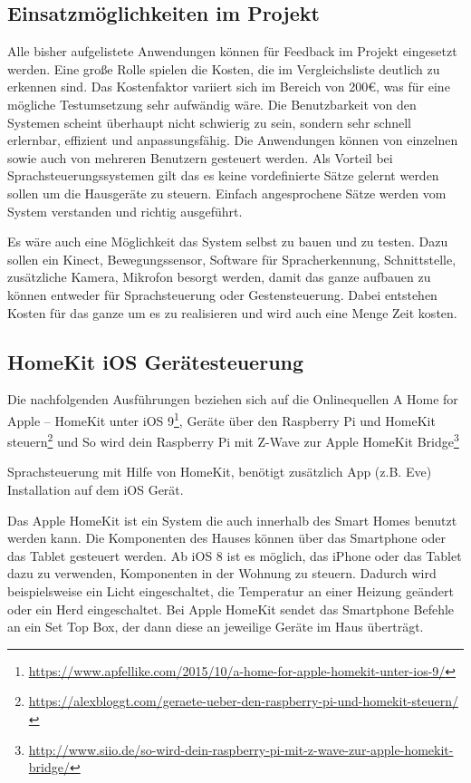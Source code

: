 \subsection{Einsatzmöglichkeiten im Projekt}
Alle bisher aufgelistete Anwendungen können für Feedback im Projekt eingesetzt werden. Eine große Rolle spielen die Kosten, die im Vergleichsliste deutlich zu erkennen sind. Das Kostenfaktor variiert sich im Bereich von 200€, was für eine mögliche Testumsetzung sehr aufwändig wäre. Die Benutzbarkeit von den Systemen scheint überhaupt nicht schwierig zu sein, sondern sehr schnell erlernbar, effizient und anpassungsfähig. Die Anwendungen können von einzelnen sowie auch von mehreren Benutzern gesteuert werden. Als Vorteil bei Sprachsteuerungssystemen gilt das es keine vordefinierte Sätze gelernt werden sollen um die Hausgeräte zu steuern. Einfach angesprochene Sätze werden vom System verstanden und richtig ausgeführt.

Es wäre auch eine Möglichkeit das System selbst zu bauen und zu testen. Dazu sollen ein Kinect,
Bewegungssensor, Software für Spracherkennung, Schnittstelle, zusätzliche Kamera, Mikrofon
besorgt werden, damit das ganze aufbauen zu können entweder für Sprachsteuerung oder Gestensteuerung. Dabei entstehen Kosten für das ganze um es zu realisieren und wird auch eine
Menge Zeit kosten.

\subsection{HomeKit iOS Gerätesteuerung}
Die nachfolgenden Ausführungen beziehen sich auf die Onlinequellen \glqq A Home for Apple – HomeKit unter iOS 9\grqq\footnote{\url{https://www.apfellike.com/2015/10/a-home-for-apple-homekit-unter-ios-9/}}, \glqq Geräte über den Raspberry Pi und HomeKit steuern\grqq\footnote{\url{https://alexbloggt.com/geraete-ueber-den-raspberry-pi-und-homekit-steuern/}} und \glqq So wird dein Raspberry Pi mit Z-Wave zur Apple HomeKit Bridge\grqq\footnote{\url{http://www.siio.de/so-wird-dein-raspberry-pi-mit-z-wave-zur-apple-homekit-bridge/}}

Sprachsteuerung mit Hilfe von HomeKit, benötigt zusätzlich App (z.B. Eve) Installation auf dem iOS Gerät.

Das Apple HomeKit ist ein System die auch innerhalb des Smart Homes benutzt werden kann. Die
Komponenten des Hauses können über das Smartphone oder das Tablet gesteuert werden. Ab iOS 8
ist es möglich, das iPhone oder das Tablet dazu zu verwenden, Komponenten in der Wohnung zu
steuern. Dadurch wird beispielsweise ein Licht eingeschaltet, die Temperatur an einer Heizung
geändert oder ein Herd eingeschaltet. Bei Apple HomeKit sendet das Smartphone Befehle an ein Set Top Box, der dann diese an jeweilige Geräte im Haus überträgt.

